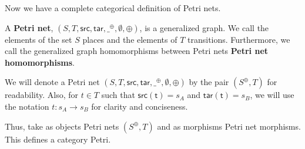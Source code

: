 Now we have a complete categorical definition of Petri nets.
%
\begin{definition}
  \label{def:Petri-Net}
  A \textbf{Petri net}, $(S, T, \mathsf{src},
  \mathsf{tar},\_^{\oplus},\emptyset,\oplus)$, is a generalized graph.  We call
  the elements of the set $S$ places and the elements of $T$
  transitions.  Furthermore, we call the generalized graph
  homomorphisms between Petri nets \textbf{Petri net homomorphisms}.
\end{definition}
We will denote a Petri net $(S, T, \mathsf{src},
\mathsf{tar},\_^{\oplus},\emptyset,\oplus)$ by the pair $(S^\oplus,T)$ for
readability. Also, for $t \in T$ such that $\mathsf{src(t)} = s_A$ and $\mathsf{tar(t)} = s_B$, we will use the notation $t : s_A \rightarrow s_B$ for clarity and conciseness. 

Thus, take as objects Petri nets $(S^\oplus, T)$ and as morphisms Petri net morphisms. This defines a category Petri.

